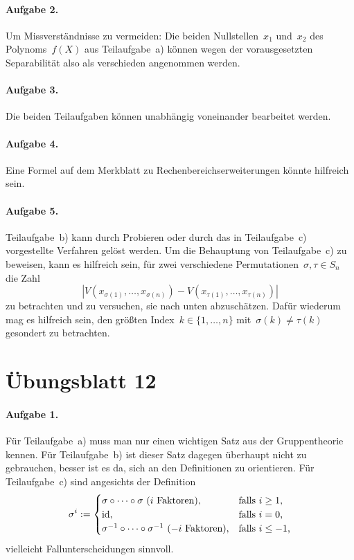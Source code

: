 \documentclass{../algblatt}
\begin{document}
\paragraph{Aufgabe 2.} Um Missverständnisse zu vermeiden: Die beiden
Nullstellen~$x_1$ und~$x_2$ des Polynoms~$f(X)$ aus Teilaufgabe~a) können
wegen der vorausgesetzten Separabilität also als verschieden angenommen werden.

\paragraph{Aufgabe 3.} Die beiden Teilaufgaben können unabhängig voneinander
bearbeitet werden.

\paragraph{Aufgabe 4.} Eine Formel auf dem Merkblatt zu
Rechenbereichserweiterungen könnte hilfreich sein.

\paragraph{Aufgabe 5.} Teilaufgabe~b) kann durch Probieren oder durch das in
Teilaufgabe~c) vorgestellte Verfahren gelöst werden. Um die Behauptung von
Teilaufgabe~c) zu beweisen, kann es hilfreich sein, für zwei verschiedene
Permutationen~$\sigma,\tau \in S_n$ die Zahl
\[ |V(x_{\sigma(1)},\ldots,x_{\sigma(n)}) -
  V(x_{\tau(1)},\ldots,x_{\tau(n)})| \]
zu betrachten und zu versuchen, sie nach unten abzuschätzen. Dafür wiederum mag
es hilfreich sein, den größten Index~$k \in \{ 1,\ldots,n \}$ mit~$\sigma(k)
\neq \tau(k)$ gesondert zu betrachten.


\section*{Übungsblatt 12}

\paragraph{Aufgabe 1.} Für Teilaufgabe~a) muss man nur einen wichtigen Satz aus
der Gruppentheorie kennen. Für Teilaufgabe~b) ist dieser Satz dagegen überhaupt
nicht zu gebrauchen, besser ist es da, sich an den Definitionen zu orientieren.
Für Teilaufgabe~c) sind angesichts der Definition
\[ \sigma^i := \begin{cases}
  \sigma \circ \cdots \circ \sigma \text{ ($i$ Faktoren)}, &
  \text{falls~$i \geq 1$,} \\
  \mathrm{id}, &
  \text{falls~$i = 0$,} \\
  \sigma^{-1} \circ \cdots \circ \sigma^{-1} \text{ ($-i$ Faktoren)}, &
  \text{falls~$i \leq -1$,}
\end{cases} \]
vielleicht Fallunterscheidungen sinnvoll.
\end{document}
